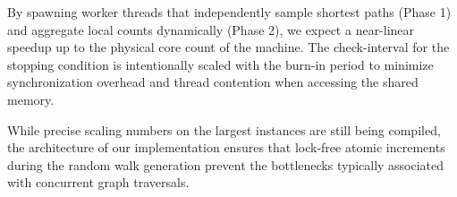 By spawning worker threads that independently sample shortest paths (Phase 1) and aggregate local counts dynamically (Phase 2), we expect a near-linear speedup up to the physical core count of the machine. The check-interval for the stopping condition is intentionally scaled with the burn-in period to minimize synchronization overhead and thread contention when accessing the shared memory. 

While precise scaling numbers on the largest instances are still being compiled, the architecture of our implementation ensures that lock-free atomic increments during the random walk generation prevent the bottlenecks typically associated with concurrent graph traversals.